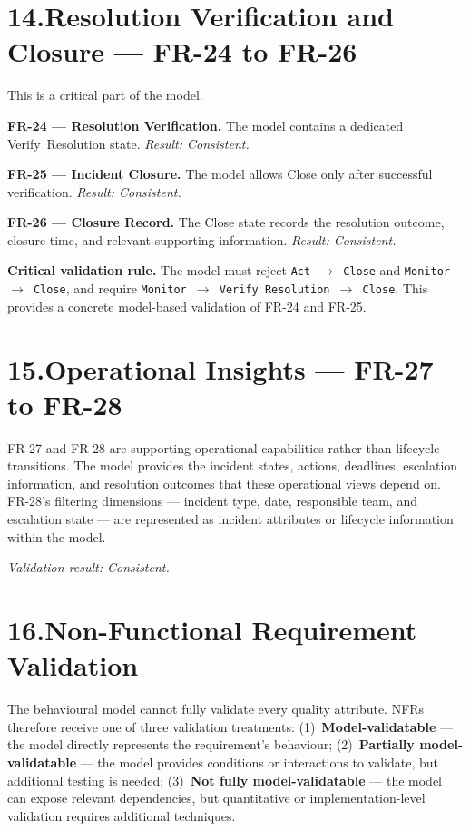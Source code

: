 \documentclass[11pt,a4paper]{article}
\begin{document}
\section*{14.\enspace Resolution Verification and Closure — FR-24 to FR-26}

This is a critical part of the model.

\textbf{FR-24 — Resolution Verification.} The model contains a dedicated Verify~Resolution state. \textit{Result: Consistent.}

\textbf{FR-25 — Incident Closure.} The model allows Close only after successful verification. \textit{Result: Consistent.}

\textbf{FR-26 — Closure Record.} The Close state records the resolution outcome, closure time, and relevant supporting information. \textit{Result: Consistent.}

\textbf{Critical validation rule.} The model must reject \texttt{Act $\rightarrow$ Close} and \texttt{Monitor $\rightarrow$ Close}, and require \texttt{Monitor $\rightarrow$ Verify Resolution $\rightarrow$ Close}. This provides a concrete model-based validation of FR-24 and FR-25.

\section*{15.\enspace Operational Insights — FR-27 to FR-28}

FR-27 and FR-28 are supporting operational capabilities rather than lifecycle transitions. The model provides the incident states, actions, deadlines, escalation information, and resolution outcomes that these operational views depend on. FR-28's filtering dimensions — incident type, date, responsible team, and escalation state — are represented as incident attributes or lifecycle information within the model.

\textit{Validation result: Consistent.}

\section*{16.\enspace Non-Functional Requirement Validation}

The behavioural model cannot fully validate every quality attribute. NFRs therefore receive one of three validation treatments: (1)~\textbf{Model-validatable} — the model directly represents the requirement's behaviour; (2)~\textbf{Partially model-validatable} — the model provides conditions or interactions to validate, but additional testing is needed; (3)~\textbf{Not fully model-validatable} — the model can expose relevant dependencies, but quantitative or implementation-level validation requires additional techniques.
\end{document}
